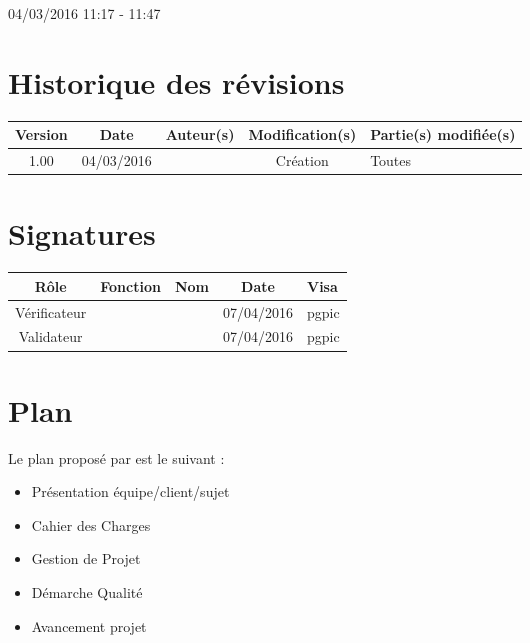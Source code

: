 \documentclass [a4paper] {article}
\begin{document}
04/03/2016			 				%
\hfill   
\hfill 	 11:17 - 11:47 				%



\section*{Historique des révisions}
\begin{center}
			\begin{tabular}{| c | c | c | c | p{4cm} |}
				\hline
				\rowcolor{Gray}
				Version & Date & Auteur(s) & Modification(s) & Partie(s) modifiée(s)		 \\
				\hline
				1.00 & 04/03/2016 & \Pierre & Création & Toutes \\
		\hline		
			\end{tabular}
		\end{center}

\section*{Signatures}

		\begin{center}
			\begin{tabular}{| c | c | c | c | p{4cm} |}
				\hline
				\rowcolor{Gray}
				Rôle & Fonction & Nom & Date & Visa		 \\
				\hline
				Vérificateur & \RQA & \Kafui & 07/04/2016 & pgpic \\[30pt]
				\hline
				Validateur & \CP & \Sergi & 07/04/2016 & pgpic \\[30pt]	
				\hline
			\end{tabular}
		\end{center}
		
\newpage		



\section{Plan}
Le plan proposé par \nomResponsableDGQ{} est le suivant :
\begin{itemize}
\item Présentation équipe/client/sujet
\item Cahier des Charges
\item Gestion de Projet
\item Démarche Qualité
\item Avancement projet
\end{itemize}
\end{document}
